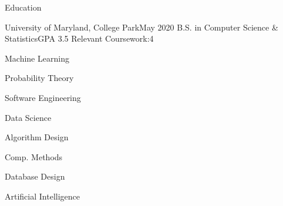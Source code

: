 \documentclass{resume} %
\begin{document}

\begin{rSection}{Education}

\begin{rColumnSubsection}{University of Maryland, College Park}{May 2020}
{B.S. in Computer Science \& Statistics}{GPA 3.5}
{Relevant Coursework:}{4}
\item Machine Learning
\item Probability Theory
\item Software Engineering
\item Data Science
\item Algorithm Design
\item Comp. Methods
\item Database Design
\item Artificial Intelligence
\end{rColumnSubsection}

\end{rSection}

\end{document}

